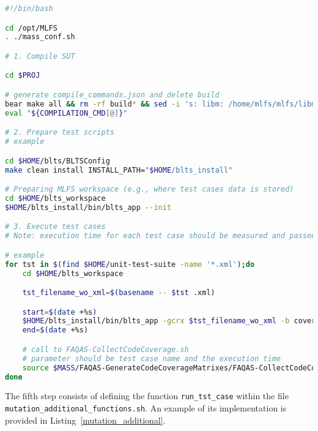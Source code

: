 \begin{lstlisting}[language=bash, label=preparesut_single, caption=PrepareSUT.sh file.]
#!/bin/bash

cd /opt/MLFS
. ./mass_conf.sh

# 1. Compile SUT

cd $PROJ

# generate compile_commands.json and delete build
bear make all && rm -rf build* && sed -i 's: libm: /home/mlfs/mlfs/libm:' compile_commands.json && mv compile_commands.json $MUTANTS_DIR
eval "${COMPILATION_CMD[@]}"

# 2. Prepare test scripts
# example

cd $HOME/blts/BLTSConfig
make clean install INSTALL_PATH="$HOME/blts_install"

# Preparing MLFS workspace (e.g., where test cases data is stored)
cd $HOME/blts_workspace
$HOME/blts_install/bin/blts_app --init

# 3. Execute test cases
# Note: execution time for each test case should be measured and passed as argument to FAQAS-CollectCodeCoverage.sh

# example
for tst in $(find $HOME/unit-test-suite -name '*.xml');do
    cd $HOME/blts_workspace

    tst_filename_wo_xml=$(basename -- $tst .xml)

    start=$(date +%s)
    $HOME/blts_install/bin/blts_app -gcrx $tst_filename_wo_xml -b coverage --nocsv -s $tst
    end=$(date +%s)

    # call to FAQAS-CollectCodeCoverage.sh
    # parameter should be test case name and the execution time
    source $MASS/FAQAS-GenerateCodeCoverageMatrixes/FAQAS-CollectCodeCoverage.sh $tst_filename_wo_xml "$(($end-$start))"
done
\end{lstlisting}

The fifth step consists of defining the function \texttt{run\_tst\_case} within the file \\\texttt{mutation\_additional\_functions.sh}. An example of its implementation is provided in Listing~\ref{mutation_additional}.

